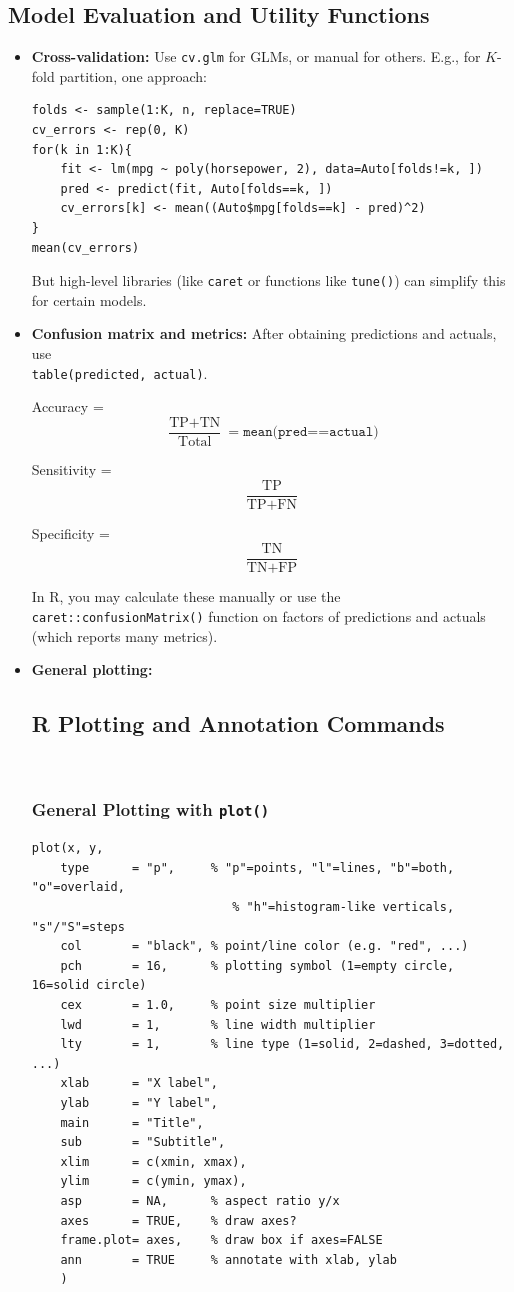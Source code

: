 \documentclass[11pt]{article}
\begin{document}
\subsection{Model Evaluation and Utility Functions}
\begin{itemize}
    \item \textbf{Cross-validation:} Use \texttt{cv.glm} for GLMs, or manual for others. E.g., for $K$-fold partition, one approach:
\begin{lstlisting}
folds <- sample(1:K, n, replace=TRUE)
cv_errors <- rep(0, K)
for(k in 1:K){
    fit <- lm(mpg ~ poly(horsepower, 2), data=Auto[folds!=k, ])
    pred <- predict(fit, Auto[folds==k, ])
    cv_errors[k] <- mean((Auto$mpg[folds==k] - pred)^2)
}
mean(cv_errors)
\end{lstlisting}
    But high-level libraries (like \texttt{caret} or functions like \texttt{tune()}) can simplify this for certain models.
    
    \item \textbf{Confusion matrix and metrics:} After obtaining predictions and actuals, use \\ \verb|table(predicted, actual)|. 

    Accuracy = 
    \[
    \frac{\text{TP} + \text{TN}}{\text{Total}} = \texttt{mean(pred==actual)}
    \]

    Sensitivity = 
    \[
    \frac{\text{TP}}{\text{TP} + \text{FN}}
    \]
    
    Specificity = 
    \[
    \frac{\text{TN}}{\text{TN} + \text{FP}}
    \]

    In R, you may calculate these manually or use the \texttt{caret::confusionMatrix()} function on factors of predictions and actuals (which reports many metrics).
    
    \item \textbf{General plotting:} 
    \subsection{R Plotting and Annotation Commands}\

\subsubsection*{General Plotting with \texttt{plot()}}
\begin{lstlisting}
plot(x, y,
    type      = "p",     % "p"=points, "l"=lines, "b"=both, "o"=overlaid,
                            % "h"=histogram-like verticals, "s"/"S"=steps
    col       = "black", % point/line color (e.g. "red", ...)
    pch       = 16,      % plotting symbol (1=empty circle, 16=solid circle)
    cex       = 1.0,     % point size multiplier
    lwd       = 1,       % line width multiplier
    lty       = 1,       % line type (1=solid, 2=dashed, 3=dotted, ...)
    xlab      = "X label",
    ylab      = "Y label",
    main      = "Title",
    sub       = "Subtitle",
    xlim      = c(xmin, xmax),
    ylim      = c(ymin, ymax),
    asp       = NA,      % aspect ratio y/x
    axes      = TRUE,    % draw axes?
    frame.plot= axes,    % draw box if axes=FALSE
    ann       = TRUE     % annotate with xlab, ylab
    )
\end{lstlisting}


\end{itemize}
\end{document}
